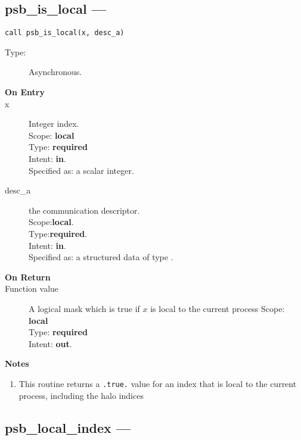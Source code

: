 \clearpage\subsection{psb\_is\_local  --- }

\begin{verbatim}
call psb_is_local(x, desc_a)
\end{verbatim}

\begin{description}
\item[Type:] Asynchronous.
\item[\bf On Entry]
\item[x] Integer index.\\
Scope: {\bf local} \\
Type: {\bf required}\\
Intent: {\bf in}.\\
Specified as: a scalar integer.\\
\item[desc\_a] the communication descriptor.\\
Scope:{\bf local}.\\
Type:{\bf required}.\\
Intent: {\bf in}.\\
Specified as: a structured data of type \descdata.
\end{description}

\begin{description}
\item[\bf On Return]
\item[Function value] A logical mask which is true if 
  $x$ is  local to the current process
Scope: {\bf local} \\
Type: {\bf required}\\
Intent: {\bf out}.\\
\end{description}


{\par\noindent\large\bfseries Notes}
\begin{enumerate}
\item This routine returns a \verb|.true.| value for an index
  that is local to the current process, including the halo
  indices
\end{enumerate}

\clearpage\subsection{psb\_local\_index  --- }

